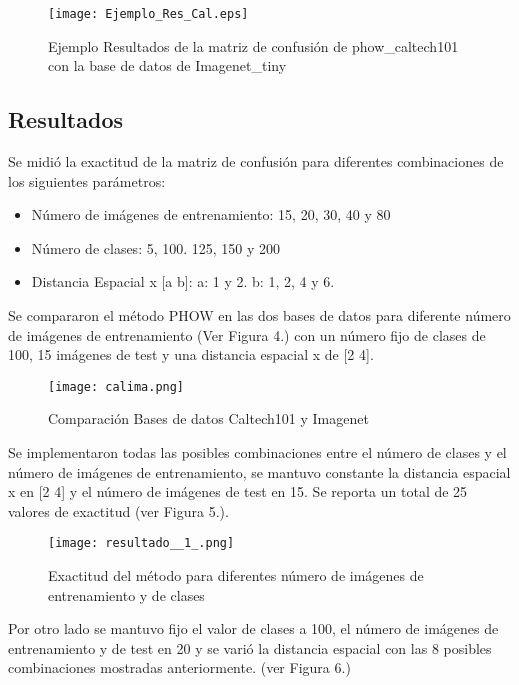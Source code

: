 \documentclass[10pt,twocolumn,letterpaper]{article}
\begin{document}
\begin{figure}[ht]
\centering

 \texttt{[image: Ejemplo\_Res\_Cal.eps]}
\caption{Ejemplo Resultados de la matriz de confusión de phow\_caltech101 con la base de datos de Imagenet\_tiny}
\end{figure}

\subsection{Resultados}

Se midió la exactitud de la matriz de confusión para diferentes combinaciones de los siguientes parámetros:

\begin{itemize}
\item Número de imágenes de entrenamiento: 15, 20, 30, 40 y 80
\item Número de clases: 5, 100. 125, 150 y 200
\item Distancia Espacial x [a b]: a: 1 y 2. b: 1, 2, 4 y 6.
 
 \end{itemize}
 
 
 
Se compararon el método PHOW en las dos bases de datos para diferente número de imágenes de entrenamiento (Ver Figura 4.) con un número fijo de clases de 100, 15 imágenes de test y una distancia espacial x de [2 4].

 \begin{figure}[ht]
\centering

 \texttt{[image: calima.png]}
\caption{Comparación Bases de datos Caltech101 y Imagenet}
\end{figure}

Se implementaron todas las posibles combinaciones entre el número de clases y el número de imágenes de entrenamiento, se mantuvo constante la distancia espacial x en [2 4] y el número de imágenes de test en 15. Se reporta un total de 25 valores de exactitud (ver Figura 5.). 

\begin{figure}[ht]
\centering
 \texttt{[image: resultado\_\_1\_.png]}
 \caption{Exactitud del método para diferentes número de imágenes de entrenamiento y de clases}
\end{figure}

Por otro lado se mantuvo fijo el valor de clases a 100, el número de imágenes de entrenamiento y de test en 20 y se varió la distancia espacial con las 8 posibles combinaciones mostradas anteriormente. (ver Figura 6.)
\end{document}
